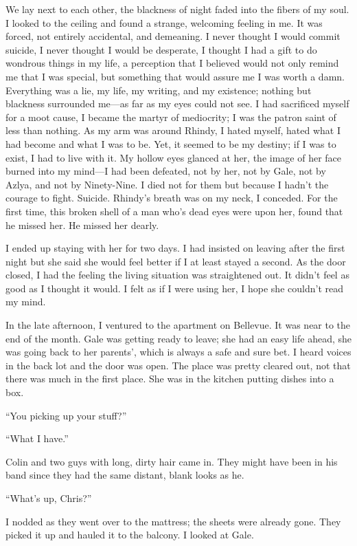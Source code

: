 We lay next to each other, the blackness of night faded into the fibers
of my soul. I looked to the ceiling and found a strange, welcoming
feeling in me. It was forced, not entirely accidental, and demeaning. I
never thought I would commit suicide, I never thought I would be
desperate, I thought I had a gift to do wondrous things in my life, a
perception that I believed would not only remind me that I was special,
but something that would assure me I was worth a damn. Everything was a
lie, my life, my writing, and my existence; nothing but blackness
surrounded me---as far as my eyes could not see. I had sacrificed myself
for a moot cause, I became the martyr of mediocrity; I was the patron
saint of less than nothing. As my arm was around Rhindy, I hated myself,
hated what I had become and what I was to be. Yet, it seemed to be my
destiny; if I was to exist, I had to live with it. My hollow eyes
glanced at her, the image of her face burned into my mind---I had been
defeated, not by her, not by Gale, not by Azlya, and not by Ninety-Nine.
I died not for them but because I hadn't the courage to fight. Suicide.
Rhindy's breath was on my neck, I conceded. For the first time, this
broken shell of a man who's dead eyes were upon her, found that he
missed her. He missed her dearly.

I ended up staying with her for two days. I had insisted on leaving
after the first night but she said she would feel better if I at least
stayed a second. As the door closed, I had the feeling the living
situation was straightened out. It didn't feel as good as I thought it
would. I felt as if I were using her, I hope she couldn't read my mind.

In the late afternoon, I ventured to the apartment on Bellevue. It was
near to the end of the month. Gale was getting ready to leave; she had
an easy life ahead, she was going back to her parents', which is always
a safe and sure bet. I heard voices in the back lot and the door was
open. The place was pretty cleared out, not that there was much in the
first place. She was in the kitchen putting dishes into a box.

``You picking up your stuff?''

``What I have.''

Colin and two guys with long, dirty hair came in. They might have been
in his band since they had the same distant, blank looks as he.

``What's up, Chris?''

I nodded as they went over to the mattress; the sheets were already
gone. They picked it up and hauled it to the balcony. I looked at Gale.

